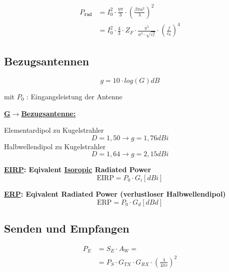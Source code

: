 \begin{align*}
    P_\texttt{rad} & = I_0^2\cdot\frac{\eta\pi}{3}\cdot\left(\frac{\beta\pi a^2}{\lambda}\right)^2                                      \\
                   & = I_0^2\cdot\frac{4}{3}\cdot Z_F\cdot\frac{\pi^5}{a^4\cdot\sqrt{\varepsilon_r^3}}\cdot\left(\frac{f}{c_0}\right)^4
\end{align*}

\subsection{Bezugsantennen}
\[
    \boxed{g = 10 \cdot log(G)\si{dB}}
\]

mit $P_0$ : Eingangsleistung der Antenne

\begin{description}
    \item \textbf{\underline{G$\rightarrow$Bezugsantenne:}}

          Elementardipol  zu Kugelstrahler \[D = 1,50 \rightarrow g = 1,76\si{dBi}\]
          Halbwellendipol zu Kugelstrahler \[D = 1,64 \rightarrow g = 2,15\si{dBi}\]

    \item \textbf{\underline{EIRP}: Eqivalent \underline{Isoropic} Radiated Power}
          \[
              \text{EIRP} = P_0 \cdot G_i [\si{dBi}]
          \]

    \item \textbf{\underline{ERP}: Eqivalent Radiated Power (verlustloser Halbwellendipol)}
          \[
              \text{ERP} = P_0 \cdot G_d [\si{dBd}]
          \]
\end{description}

\subsection{Senden und Empfangen}
\begin{align*}
    P_E & = S_E\cdot A_W =                                                         \\
        & = P_S\cdot G_{TX}\cdot G_{RX}\cdot \left(\frac{\lambda}{4\pi r}\right)^2
\end{align*}
